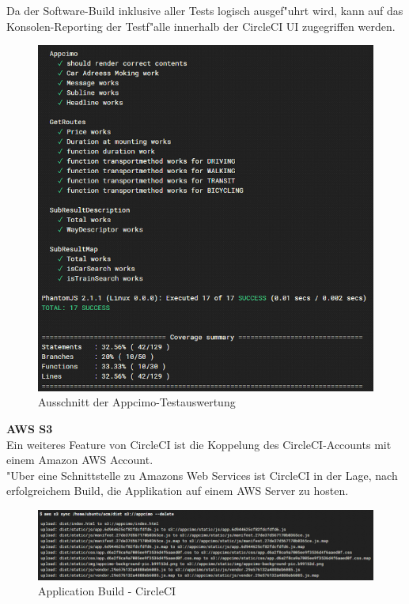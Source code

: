 \documentclass[a4paper, 11pt]{scrreprt}
\begin{document}
Da der Software-Build inklusive aller Tests logisch ausgef"uhrt wird, kann auf das Konsolen-Reporting der Testf"alle innerhalb der CircleCI UI zugegriffen werden. \\


\begin{figure} [H]
\begin{center}
\includegraphics[scale=0.7]{build2.png}
\caption{Ausschnitt der Appcimo-Testauswertung}
\label{circlecitest}
\end{center}
\end{figure}


\textbf{AWS S3} \\
Ein weiteres Feature von CircleCI ist die Koppelung des CircleCI-Accounts mit einem Amazon AWS Account. \\
"Uber eine Schnittstelle zu Amazons Web Services ist CircleCI in der Lage, nach erfolgreichem Build, die Applikation auf einem AWS Server zu hosten.\\

\begin{figure} [H]
\begin{center}
\includegraphics[scale=0.7]{build3.png}
\caption{Application Build - CircleCI}
\label{circlecitest}
\end{center}
\end{figure}
\end{document}
